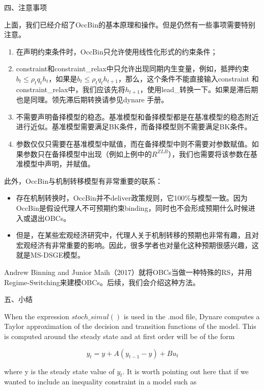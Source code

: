 \documentclass[cn,10pt,math=newtx,citestyle=gb7714-2015,bibstyle=gb7714-2015]{elegantbook}
\begin{document}
四、注意事项

上面，我们已经介绍了OccBin的基本原理和操作。但是仍然有一些事项需要特别注意。
\begin{enumerate}
	
	\item 在声明约束条件时，OccBin只允许使用线性化形式的约束条件；
	
	\item constraint和constraint\_relax中只允许出现同期内生变量，例如，抵押约束$b_t\le\rho_tq_th_t$，如果是$b_t\le\rho_tq_th_{t+1}$，那么，这个条件不能直接输入constraint 和constraint\_relax中，我们应该先将$h_{t+1}$，使用lead\_转换一下。如果是滞后期也是同理。领先滞后期转换请参见dynare 手册。
	
	\item 不需要声明备择模型的稳态。基准模型和备择模型都是在基准模型的稳态附近进行近似。基准模型需要满足BK条件，而备择模型则不需要满足BK条件。
	
	\item 参数仅仅只需要在基准模型中赋值，而在备择模型中则不需要对参数赋值。如果参数只在备择模型中出现（例如上例中的$R^{ZLB}$），我们也需要将该参数在基准模型中声明，并赋值。
\end{enumerate}


此外，OccBin与机制转移模型有非常重要的联系：
\begin{itemize}
	\item 存在机制转换时，OccBin并不deliver政策规则，它100\%与模型一致。因为OccBin是假设代理人不可预期约束binding，同时也不会形成预期什么时候进入或退出OBCs。
	
	\item 但是，在某些宏观经济研究中，代理人关于机制转移的预期也非常有趣，且对宏观经济有非常重要的影响。因此，很多学者也对量化这种预期很感兴趣，这就是MS-DSGE模型。
	
\end{itemize}

Andrew Binning and Junior Maih（2017）就将OBCs当做一种特殊的RS，并用Regime-Switching来建模OBCs。后续，我们会介绍这种方法。

五、小结

When the expression $stoch\_simul()$ is used in the .mod file, Dynare computes a Taylor approximation of the decision and transition functions of the model. This is computed around the steady state and at first order will be of the form

$$y_t=y+A(y_{t-1}-y)+Bu_t$$

where y is the steady state value of $y_t$. It is worth pointing out here that if we wanted to include an inequality constraint in a model such as
\end{document}
